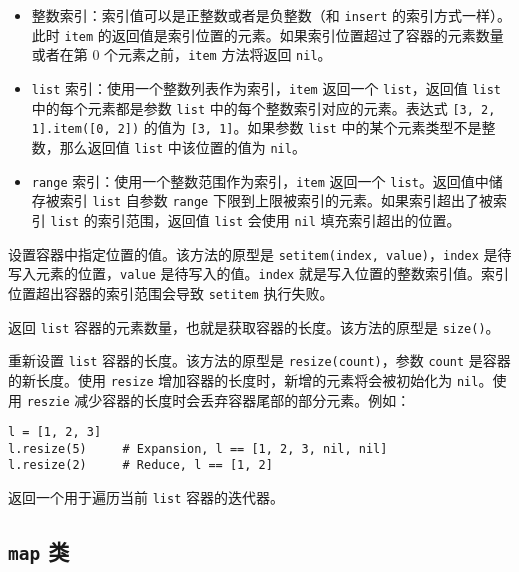 \begin{itemize}
    \item 整数索引：索引值可以是正整数或者是负整数（和 \texttt{insert} 的索引方式一样）。此时 \texttt{item} 的返回值是索引位置的元素。如果索引位置超过了容器的元素数量或者在第 0 个元素之前，\texttt{item} 方法将返回 \texttt{nil}。
    \item \texttt{list} 索引：使用一个整数列表作为索引，\texttt{item} 返回一个 \texttt{list}，返回值 \texttt{list} 中的每个元素都是参数 \texttt{list} 中的每个整数索引对应的元素。表达式 \texttt{[3, 2, 1].item([0, 2])} 的值为 \texttt{[3, 1]}。如果参数 \texttt{list} 中的某个元素类型不是整数，那么返回值 \texttt{list} 中该位置的值为 \texttt{nil}。
    \item \texttt{range} 索引：使用一个整数范围作为索引，\texttt{item} 返回一个 \texttt{list}。返回值中储存被索引 \texttt{list} 自参数 \texttt{range} 下限到上限被索引的元素。如果索引超出了被索引 \texttt{list} 的索引范围，返回值 \texttt{list} 会使用 \texttt{nil} 填充索引超出的位置。
\end{itemize}


设置容器中指定位置的值。该方法的原型是 \texttt{setitem(index, value)}，\texttt{index} 是待写入元素的位置，\texttt{value} 是待写入的值。\texttt{index} 就是写入位置的整数索引值。索引位置超出容器的索引范围会导致 \texttt{setitem} 执行失败。


返回 \texttt{list} 容器的元素数量，也就是获取容器的长度。该方法的原型是 \texttt{size()}。


重新设置 \texttt{list} 容器的长度。该方法的原型是 \texttt{resize(count)}，参数 \texttt{count} 是容器的新长度。使用 \texttt{resize} 增加容器的长度时，新增的元素将会被初始化为 \texttt{nil}。使用 \texttt{reszie} 减少容器的长度时会丢弃容器尾部的部分元素。例如：
\begin{lstlisting}[language=berry, numbers=none]
l = [1, 2, 3]
l.resize(5)     # Expansion, l == [1, 2, 3, nil, nil]
l.resize(2)     # Reduce, l == [1, 2]
\end{lstlisting}


返回一个用于遍历当前 \texttt{list} 容器的迭代器。

\subsection{\texttt{map} 类}

